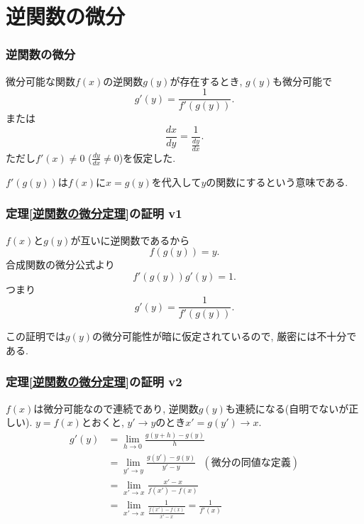 
\section{逆関数の微分}


\begin{frame}
\frametitle{逆関数の微分}

\begin{Thm} \label{逆関数の微分定理}
微分可能な関数$f(x)$の逆関数$g(y)$が存在するとき, $g(y)$も微分可能で
$$
g'(y)= \frac{1}{f'(g(y))}. 
$$
または
$$
\frac{dx}{dy}=\frac{1}{\frac{dy}{dx}}. 
$$
ただし$f'(x)\neq 0$ ($\frac{dy}{dx} \neq0$)を仮定した. 
\end{Thm}
$f'(g(y))$は$f(x)$に$x=g(y)$を代入して$y$の関数にするという意味である. 



\end{frame}






\begin{frame}
\frametitle{定理\ref{逆関数の微分定理}の証明 v1}

$f(x)$と$g(y)$が互いに逆関数であるから
$$
f(g(y))=y. 
$$
合成関数の微分公式より
$$
f'(g(y))g'(y)=1. 
$$
つまり
$$
g'(y)= \frac{1}{f'(g(y))}. 
$$

この証明では$g(y)$の微分可能性が暗に仮定されているので, 厳密には不十分である. 

\end{frame}





\begin{frame}
\frametitle{定理\ref{逆関数の微分定理}の証明 v2}

$f(x)$は微分可能なので連続であり, 逆関数$g(y)$も連続になる(自明でないが正しい). 
$y=f(x)$とおくと, $y'\to y$のとき$x'=g(y')\to x$.  
\begin{align*}
g'(y) &= \lim_{h\to 0}\frac{g(y+h)-g(y)}{h} \\
&= \lim_{y'\to y}\frac{g(y')-g(y)}{y'-y} \ \ \  (\text{微分の同値な定義})\\
& = \lim_{x'\to x} \frac{x'-x}{f(x')-f(x)} \\
& = \lim_{x'\to x} \frac{1}{\frac{f(x')-f(x)}{x'-x}} = \frac{1}{f'(x)}
\end{align*}


\end{frame}




